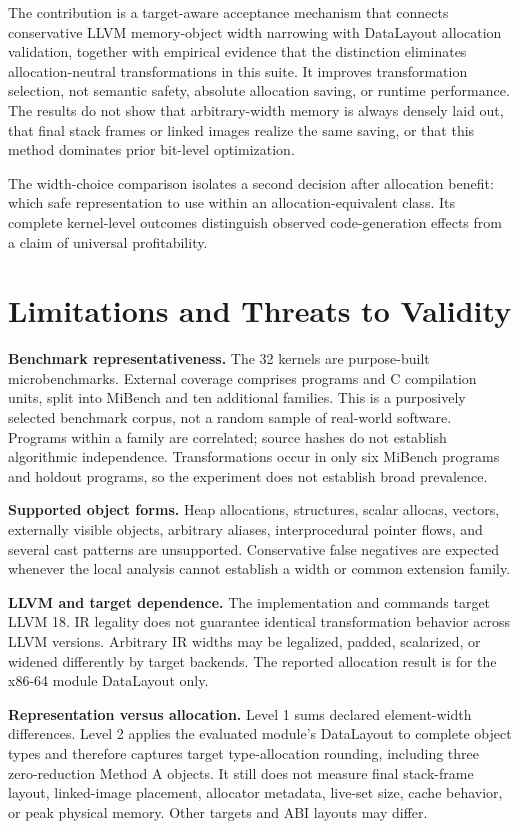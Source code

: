 \documentclass[11pt,twocolumn]{article}
\begin{document}
The contribution is a target-aware acceptance mechanism that connects
conservative LLVM memory-object width narrowing with DataLayout allocation
validation, together with empirical evidence that the distinction eliminates
allocation-neutral transformations in this suite. It improves transformation
selection, not semantic safety, absolute allocation saving, or runtime
performance. The results do not show that arbitrary-width memory is always
densely laid out, that final stack frames or linked images realize the same
saving, or that this method dominates prior bit-level optimization.

The width-choice comparison isolates a second decision after allocation benefit: which safe representation to use within an allocation-equivalent class. Its complete kernel-level outcomes distinguish observed code-generation effects from a claim of universal profitability.

\section{Limitations and Threats to Validity}

\textbf{Benchmark representativeness.} The 32 kernels are purpose-built
microbenchmarks. External coverage comprises \AllExternalPrograms{} programs
and \AllExternalUnits{} C compilation units, split into MiBench and ten
additional families. This is a purposively selected benchmark corpus, not a
random sample of real-world software. Programs within a family are correlated;
source hashes do not establish algorithmic independence. Transformations occur
in only six MiBench programs and \ExpandedAffectedPrograms{} holdout programs,
so the experiment does not establish broad prevalence.

\textbf{Supported object forms.} Heap allocations, structures, scalar allocas,
vectors, externally visible objects, arbitrary aliases, interprocedural pointer
flows, and several cast patterns are unsupported. Conservative false negatives
are expected whenever the local analysis cannot establish a width or common
extension family.

\textbf{LLVM and target dependence.} The implementation and commands target
LLVM 18. IR legality does not guarantee identical transformation behavior across
LLVM versions. Arbitrary IR widths may be legalized, padded, scalarized, or
widened differently by target backends. The reported allocation result is for
the x86-64 module DataLayout only.

\textbf{Representation versus allocation.} Level 1 sums declared element-width
differences. Level 2 applies the evaluated module's DataLayout to complete object
types and therefore captures target type-allocation rounding, including
three zero-reduction Method A objects. It still does not measure final stack-frame layout,
linked-image placement, allocator metadata, live-set size, cache behavior, or
peak physical memory. Other targets and ABI layouts may differ.
\end{document}
